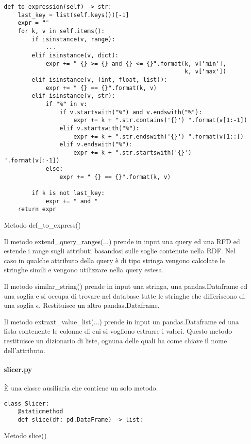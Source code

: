 \begin{listing}[H]
\begin{verbatim}
def to_expression(self) -> str:
    last_key = list(self.keys())[-1]
    expr = ""
    for k, v in self.items():
        if isinstance(v, range):
            ...
        elif isinstance(v, dict):
            expr += " {} >= {} and {} <= {}".format(k, v['min'],
                                                    k, v['max'])
        elif isinstance(v, (int, float, list)):
            expr += " {} == {}".format(k, v)
        elif isinstance(v, str):
            if "%" in v:
                if v.startswith("%") and v.endswith("%"):
                    expr += k + ".str.contains('{}') ".format(v[1:-1])
                elif v.startswith("%"):
                    expr += k + ".str.endswith('{}') ".format(v[1::])
                elif v.endswith("%"):
                    expr += k + ".str.startswith('{}') ".format(v[:-1])
            else:
                expr += " {} == {}".format(k, v)

        if k is not last_key:
            expr += " and "
    return expr
\end{verbatim}
\caption{Metodo def{\_}to{\_}express()}
\label{Code:9}
\end{listing}

Il metodo extend{\_}query{\_}ranges(...) prende in input una query ed una RFD ed estende i range sugli attributi basandosi sulle soglie contenute nella RDF. Nel caso in qualche attributo della query è di tipo stringa vengono calcolate le stringhe simili e vengono utilizzare nella query estesa.

Il metodo similar{\_}string() prende in input una stringa, una pandas.Dataframe ed una soglia e si occupa di trovare nel database tutte le stringhe che differiscono di una soglia $\epsilon$. Restituisce un altro pandas.Dataframe.

Il metodo extraxt{\_}value{\_}list(...) prende in input un pandas.Dataframe ed una lista contenente le colonne di cui si vogliono estrarre i valori. Questo metodo restituisce un dizionario di liste, ognuna delle quali ha come chiave il nome dell'attributo.

\paragraph{slicer.py}
È una classe ausiliaria che contiene un solo metodo.
\begin{listing}[H]
\begin{verbatim}
class Slicer:
    @staticmethod
    def slice(df: pd.DataFrame) -> list:
\end{verbatim}
\caption{Metodo slice()}
\label{Code:14}
\end{listing}

